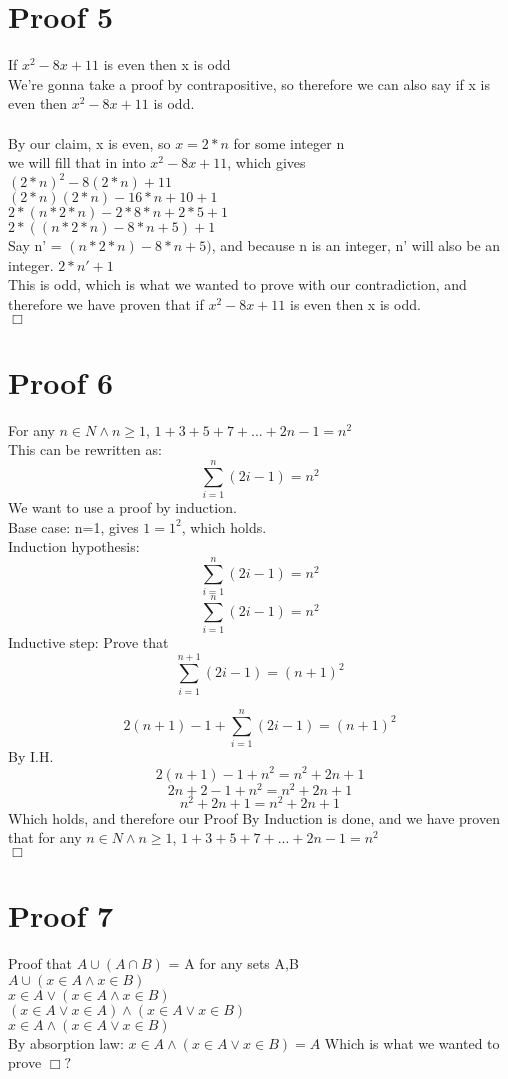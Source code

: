 \documentclass{article}
\begin{document}
\section{Proof 5}
If $x^2-8x+11$ is even then x is odd\\
We're gonna take a proof by contrapositive, so therefore we can also say if x is even then $x^2-8x+11$ is odd.\\
\\
By our claim, x is even, so $x=2*n$ for some integer n\\
we will fill that in into $x^2-8x+11$, which gives\\
$(2*n)^2-8(2*n)+11$\\
$(2*n)(2*n)-16*n+10+1$\\
$2*(n*2*n)-2*8*n+2*5+1$\\
$2*((n*2*n)-8*n+5)+1$\\
Say n' = $(n*2*n)-8*n+5)$, and because n is an integer, n' will also be an integer.
$2*n'+1$\\
This is odd, which is what we wanted to prove with our contradiction, and therefore we have proven that if $x^2-8x+11$ is even then x is odd.\\
$\Box$

\section{Proof 6}

For any $n \in N \land n \geq 1$, $1+3+5+7+...+2n-1 = n^2$\\
This can be rewritten as: $$\sum_{i=1}^{n}(2i-1) = n^2$$
We want to use a proof by induction.\\
Base case: n=1, gives $1=1^2$, which holds.\\
Induction hypothesis: $$\sum_{i=1}^{n}(2i-1) = n^2$$
$$\sum_{i=1}^{n}(2i-1) = n^2$$
Inductive step: Prove that $$\sum_{i=1}^{n+1}(2i-1) = (n+1)^2$$

$$2(n+1)-1 + \sum_{i=1}^{n}(2i-1) = (n+1)^2$$
By I.H.
$$2(n+1)-1 + n^2 = n^2+2n+1$$
$$2n+2-1 + n^2 = n^2+2n+1$$
$$n^2+2n+1  = n^2+2n+1$$
Which holds, and therefore our Proof By Induction is done, and we have proven that for any $n \in N \land n \geq 1$, $1+3+5+7+...+2n-1 = n^2$\\
$\Box$

\section{Proof 7}
Proof that $A \cup (A \cap B)$ = A for any sets A,B\\
$A \cup (x \in A \land x \in B)$\\
$x \in A \lor (x \in A \land x \in B)$\\
$(x \in A \lor x \in A) \land (x \in A \lor x \in B)$\\
$x \in A \land (x \in A \lor x \in B)$\\
By absorption law:
$x \in A \land (x \in A \lor x \in B) = A$
Which is what we wanted to prove
$\Box?$
\end{document}

